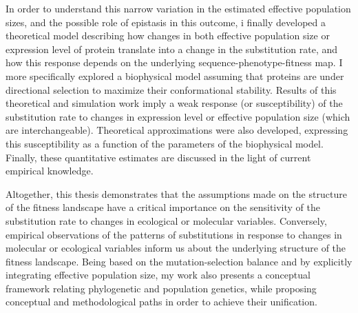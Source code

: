 In order to understand this narrow variation in the estimated effective population sizes, and the possible role of epistasis in this outcome, i finally developed a theoretical model describing how changes in both effective population size or expression level of protein translate into a change in the substitution rate, and how this response depends on the underlying sequence-phenotype-fitness map.
I more specifically explored a biophysical model assuming that proteins are under directional selection to maximize their conformational stability.
Results of this theoretical and simulation work imply a weak response (or susceptibility) of the substitution rate to changes in expression level or effective population size (which are interchangeable).
Theoretical approximations were also developed, expressing this susceptibility as a function of the parameters of the biophysical model.
Finally, these quantitative estimates are discussed in the light of current empirical knowledge.

Altogether, this thesis demonstrates that the assumptions made on the structure of the fitness landscape have a critical importance on the sensitivity of the substitution rate to changes in ecological or molecular variables.
Conversely, empirical observations of the patterns of substitutions in response to changes in molecular or ecological variables inform us about the underlying structure of the fitness landscape.
Being based on the mutation-selection balance and by explicitly integrating effective population size, my work also presents a conceptual framework relating phylogenetic and population genetics, while proposing conceptual and methodological paths in order to achieve their unification.
